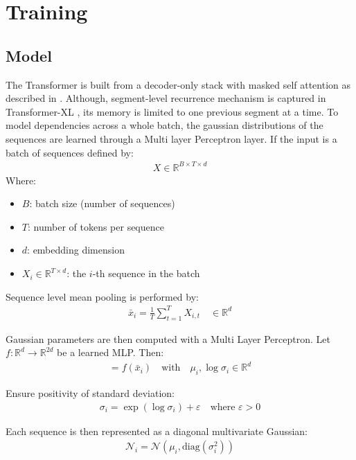 \documentclass[twoside,11pt]{article}
\begin{document}
\section{Training}
\subsection{Model}
The Transformer is built from a decoder-only stack with masked self attention as described in \cite{Vaswani2}. Although, segment-level recurrence mechanism is captured in Transformer-XL \cite{transformerXL},  its memory is limited to one previous segment at a time. To model dependencies across a whole batch, the gaussian distributions of the sequences are learned through a Multi layer Perceptron layer.
If the input is a batch of sequences defined by:
\begin{align}
X \in \mathbb{R}^{B \times T \times d}
\end{align}
Where:
\begin{itemize}
    \item \( B \): batch size (number of sequences)
    \item \( T \): number of tokens per sequence
    \item \( d \): embedding dimension
    \item \( X_i \in \mathbb{R}^{T \times d} \): the \(i\)-th sequence in the batch
\end{itemize}

Sequence level mean pooling is performed by:
\begin{align}
\bar{x}_i = \frac{1}{T} \sum_{t=1}^{T} X_{i,t} \quad \in \mathbb{R}^{d}
\end{align}

Gaussian parameters are then computed with a Multi Layer Perceptron.
Let \( f: \mathbb{R}^{d} \rightarrow \mathbb{R}^{2d} \) be a learned MLP.
Then:
\begin{align}
[\mu_i, \log \sigma_i] = f(\bar{x}_i)
\quad \text{with} \quad 
\mu_i, \log \sigma_i \in \mathbb{R}^{d}
\end{align}

Ensure positivity of standard deviation:
\begin{align}
\sigma_i = \exp(\log \sigma_i) + \varepsilon
\quad \text{where } \varepsilon > 0
\end{align}

Each sequence is then represented as a diagonal multivariate Gaussian:
\begin{align}
\mathcal{N}_i = \mathcal{N}(\mu_i, \mathrm{diag}(\sigma_i^2))
\end{align}
\end{document}
